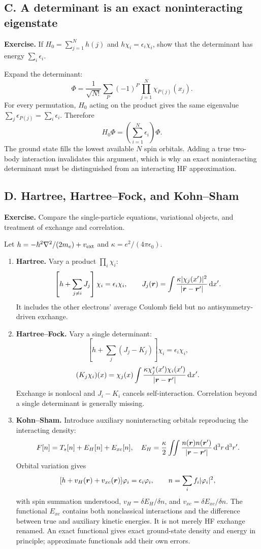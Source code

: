 \subsection*{C. A determinant is an exact noninteracting eigenstate}
\textbf{Exercise.} If $H_0=\sum_{j=1}^Nh(j)$ and $h\chi_i=\epsilon_i\chi_i$, show that the determinant has energy $\sum_i\epsilon_i$.

Expand the determinant:
\[
\Phi=\frac1{\sqrt{N!}}\sum_P(-1)^P\prod_{j=1}^N\chi_{P(j)}(x_j).
\]
For every permutation, $H_0$ acting on the product gives the same eigenvalue $\sum_j\epsilon_{P(j)}=\sum_i\epsilon_i$. Therefore
\[
H_0\Phi=\left(\sum_{i=1}^N\epsilon_i\right)\Phi.
\]
The ground state fills the lowest available $N$ spin orbitals. Adding a true two-body interaction invalidates this argument, which is why an exact noninteracting determinant must be distinguished from an interacting HF approximation.

\subsection*{D. Hartree, Hartree--Fock, and Kohn--Sham}
\textbf{Exercise.} Compare the single-particle equations, variational objects, and treatment of exchange and correlation.

Let $h=-\hbar^2\nabla^2/(2m_e)+v_{\rm ext}$ and $\kappa=e^2/(4\pi\epsilon_0)$.
\begin{enumerate}[label=(\roman*)]
\item \textbf{Hartree.} Vary a product $\prod_i\chi_i$:
\[
\left[h+\sum_{j\ne i}J_j\right]\chi_i=\epsilon_i\chi_i,\qquad
J_j(\boldsymbol{r})=\int\frac{\kappa|\chi_j(x')|^2}{|\boldsymbol{r}-\boldsymbol{r}'|}\mathop{}\!\mathrm{d} x'.
\]
It includes the other electrons' average Coulomb field but no antisymmetry-driven exchange.
\item \textbf{Hartree--Fock.} Vary a single determinant:
\[
\left[h+\sum_j(J_j-K_j)\right]\chi_i=\epsilon_i\chi_i,
\]
\[
(K_j\chi_i)(x)=\chi_j(x)\int
\frac{\kappa\chi_j^*(x')\chi_i(x')}{|\boldsymbol{r}-\boldsymbol{r}'|}\mathop{}\!\mathrm{d} x'.
\]
Exchange is nonlocal and $J_i-K_i$ cancels self-interaction. Correlation beyond a single determinant is generally missing.
\item \textbf{Kohn--Sham.} Introduce auxiliary noninteracting orbitals reproducing the interacting density:
\[
F[n]=T_s[n]+E_H[n]+E_{xc}[n],\quad
E_H=\frac\kappa2\iint\frac{n(\boldsymbol{r})n(\boldsymbol{r}')}{|\boldsymbol{r}-\boldsymbol{r}'|}\mathop{}\!\mathrm{d}^3r\mathop{}\!\mathrm{d}^3r'.
\]
Orbital variation gives
\[
[h+v_H(\boldsymbol{r})+v_{xc}(\boldsymbol{r})]\varphi_i=\epsilon_i\varphi_i,\qquad
n=\sum_i f_i|\varphi_i|^2,
\]
with spin summation understood, $v_H=\delta E_H/\delta n$, and $v_{xc}=\delta E_{xc}/\delta n$. The functional $E_{xc}$ contains both nonclassical interactions and the difference between true and auxiliary kinetic energies. It is not merely HF exchange renamed. An exact functional gives exact ground-state density and energy in principle; approximate functionals add their own errors.
\end{enumerate}

